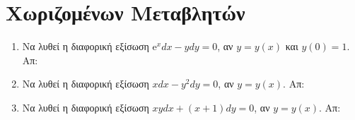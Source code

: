 



\pagestyle{askhseis}




\begin{center}
  \minibox{\large \bfseries \textcolor{Col1}{Διαφορικές Εξισώσεις}}
\end{center}

\vspace{\baselineskip}

\section*{Χωριζομένων Μεταβλητών}

\begin{enumerate}
  \item Να λυθεί η διαφορική εξίσωση $ \mathrm{e}^{x} dx - ydy = 0 $, αν $ y=y(x) $ 
    και $ y(0)=1 $. \hfill Απ: %
  \item Να λυθεί η διαφορική εξίσωση $ xdx-y^{2}dy=0  $, αν $ y=y(x) $. 
    \hfill Απ: %
  \item Να λυθεί η διαφορική εξίσωση $ xydx+(x+1)dy=0 $, αν $ y=y(x) $. 
    \hfill Απ: %
    \end{enumerate}



